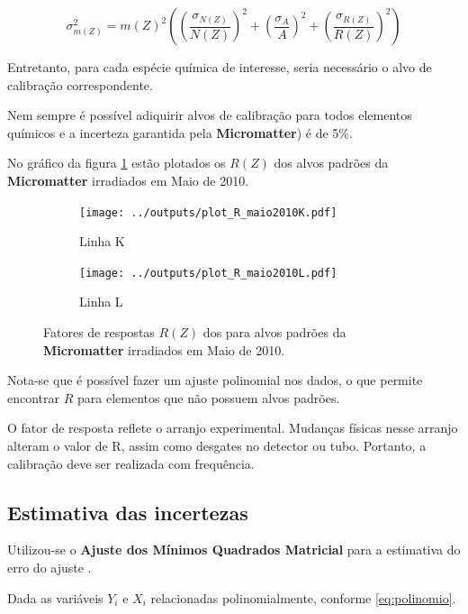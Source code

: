 \begin{equation}
  \label{eq:erro_massa}
  \sigma_{m(Z)}^2 = {m(Z)}^2 \left( \left(\frac{\sigma_{N(Z)}}{N(Z)}\right)^2 + 
                                  \left(\frac{\sigma_A}{A}\right)^2 + 
                                  \left(\frac{\sigma_{R(Z)}}{R(Z)}\right)^2 
                             \right)
\end{equation}


Entretanto, para cada espécie química de interesse, seria necessário 
o alvo de calibração correspondente.

Nem sempre é possível adiquirir alvos de calibração para todos elementos
químicos e a incerteza garantida pela \textbf{Micromatter}) é de 5\%. 

No gráfico da figura \ref{fg:edxrfcalib} estão plotados os $R(Z)$ 
dos alvos padrões da \textbf{Micromatter} irradiados em Maio de 2010. 

\begin{figure}[H]
  \begin{subfigure}[b]{0.45\textwidth}
    \texttt{[image: ../outputs/plot\_R\_maio2010K.pdf]}
    \caption{Linha K}
  \end{subfigure}%
  \begin{subfigure}[b]{0.45\textwidth}
    \texttt{[image: ../outputs/plot\_R\_maio2010L.pdf]}
    \caption{Linha L}
  \end{subfigure}
  \caption{Fatores de respostas $R(Z)$ dos para alvos padrões da 
           \textbf{Micromatter} irradiados em Maio de 2010. 
           \label{fg:edxrfcalib}}
\end{figure}

Nota-se que é possível fazer um ajuste polinomial nos dados, o que 
permite encontrar $R$ para elementos que não possuem alvos padrões.

O fator de resposta reflete o arranjo experimental. Mudanças físicas
nesse arranjo alteram o valor de R, assim como desgates no detector
ou tubo. Portanto, a calibração deve ser realizada com frequência.

\subsection{Estimativa das incertezas}

Utilizou-se o \textbf{Ajuste dos Mínimos Quadrados Matricial} 
para a estimativa do erro do ajuste \citep{helene2006}.

Dada as variáveis $Y_i$ e $X_i$ relacionadas polinomialmente, 
conforme \ref{eq:polinomio}.

